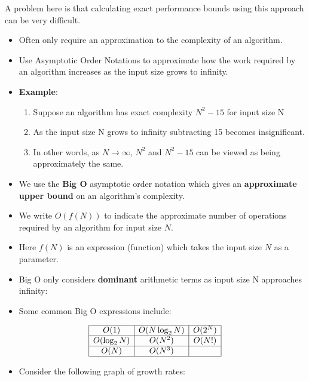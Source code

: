 \documentclass[a4paper,12pt]{article}
\begin{document}
A problem here is that calculating exact performance bounds using this approach can be very difficult.
\begin{itemize}
    \item Often only require an approximation to the complexity of an algorithm.
    \item Use Asymptotic Order Notations to approximate how the work required by an algorithm increases as the input size grows to infinity.
    \item \textbf{Example}:
    \begin{enumerate}
        \item Suppose an algorithm has exact complexity $N^2 - 15$ for input size N
        \item As the input size N grows to infinity subtracting 15 becomes insignificant.
        \item In other words, as $N \to \infty$, $N^2$ and $N^2 - 15$ can be viewed as being approximately the same.
    \end{enumerate}
\end{itemize}

\begin{itemize}
    \item We use the \textbf{Big O} asymptotic order notation which gives an \textbf{approximate upper bound} on an algorithm's complexity.
    \item We write \(O(f(N))\) to indicate the approximate number of operations required by an algorithm for input size \(N\).
    \item Here \(f(N)\) is an expression (function) which takes the input size \(N\) as a parameter.
    \item Big O only considers \textbf{dominant} arithmetic terms as input size N approaches infinity:
    \item Some common Big O expressions include:
\end{itemize}

\[
\begin{array}{|c|c|c|}
\hline
O(1) & O(N \log_2 N) & O(2^N) \\
\hline
O(\log_2 N) & O(N^2) & O(N!) \\
\hline
O(N) & O(N^3) & \\
\hline
\end{array}
\]

\begin{itemize}
    \item Consider the following graph of growth rates:
\end{itemize}
\end{document}
